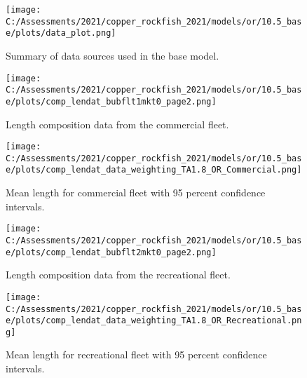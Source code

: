 \documentclass[11pt,
  english,
  a4paper,
]{article}
\begin{document}
\begin{figure}
\centering
\texttt{[image: C:/Assessments/2021/copper\_rockfish\_2021/models/or/10.5\_base/plots/data\_plot.png]}
\caption{Summary of data sources used in the base model.\label{fig:data-plot}}
\end{figure}

\tagmcend\tagstructend


\begin{figure}
\centering
\texttt{[image: C:/Assessments/2021/copper\_rockfish\_2021/models/or/10.5\_base/plots/comp\_lendat\_bubflt1mkt0\_page2.png]}
\caption{Length composition data from the commercial fleet.\label{fig:com-len-data}}
\end{figure}

\tagmcend\tagstructend


\begin{figure}
\centering
\texttt{[image: C:/Assessments/2021/copper\_rockfish\_2021/models/or/10.5\_base/plots/comp\_lendat\_data\_weighting\_TA1.8\_OR\_Commercial.png]}
\caption{Mean length for commercial fleet with 95 percent confidence intervals.\label{fig:mean-com-len-data}}
\end{figure}

\tagmcend\tagstructend


\begin{figure}
\centering
\texttt{[image: C:/Assessments/2021/copper\_rockfish\_2021/models/or/10.5\_base/plots/comp\_lendat\_bubflt2mkt0\_page2.png]}
\caption{Length composition data from the recreational fleet.\label{fig:rec-len-data}}
\end{figure}

\tagmcend\tagstructend


\begin{figure}
\centering
\texttt{[image: C:/Assessments/2021/copper\_rockfish\_2021/models/or/10.5\_base/plots/comp\_lendat\_data\_weighting\_TA1.8\_OR\_Recreational.png]}
\caption{Mean length for recreational fleet with 95 percent confidence intervals.\label{fig:mean-rec-len-data}}
\end{figure}
\end{document}
